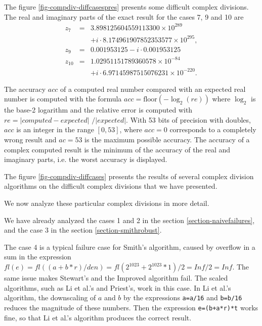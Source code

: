 \documentclass{paper}
\newcommand{\scivar}[1]{\texttt{#1}}
\begin{document}
The figure \ref{fig-compdiv-diffcasespres} presents some difficult complex divisions. 
The real and imaginary parts of the exact result for the cases 7, 9 and 10 are
\begin{eqnarray}
z_7 &=& 3.898125604559113300 \times 10^{289}          \nonumber \\
     && + i \cdot 8.174961907852353577 \times 10^{295},   \nonumber \\
z_9 &=&0.001953125 - i \cdot 0.001953125                      \nonumber \\
z_{10} &=& 1.02951151789360578\times 10^{-84}         \nonumber \\
        && + i \cdot 6.97145987515076231\times 10^{-220}. \nonumber 
\end{eqnarray}

The accuracy $acc$ of a computed real number compared 
with an expected real number is computed with the formula 
$acc = \textrm{floor}(-\log_2 ( re ))$
where $\log_2$ is the base-2 logarithm and 
the relative error is computed with $re = |computed-expected|$ 
$/|expected|$.
With 53 bits of precision with doubles, $acc$ is an integer  
in the range $[0,53]$, where $acc=0$ corresponds to a 
completely wrong result and $ac=53$ is the maximum 
possible accuracy. 
The accuracy of a complex computed result is the minimum of the 
accuracy of the real and imaginary parts, i.e. the worst 
accuracy is displayed. 

The figure \ref{fig-compdiv-diffcases} presents the results of several complex division algorithms 
on the difficult complex divisions that we have presented.

We now analyze these particular complex divisions in more detail.

We have already analyzed the cases 1 and 2 in the section \ref{section-naivefailures}, 
and the case 3 in the section \ref{section-smithrobust}.

The case 4 is a typical failure case for Smith's algorithm,
caused by overflow in a sum in the expression $fl(e) = fl((a + b * r) / den) 
= fl(2^{1023} + 2^{1023}*1)/2 = Inf/2=Inf$. 
The same issue makes Stewart's and the Improved algorithm fail. 
The scaled algorithms, such as Li et al.'s and Priest's, work in this case. 
In Li et al.'s algorithm, the downscaling of $a$ and $b$ by the 
expressions \scivar{a=a/16} and \scivar{b=b/16} reduces the magnitude 
of these numbers. 
Then the expression \scivar{e=(b+a*r)*t} works fine, so that Li et al.'s 
algorithm produces the correct result.
\end{document}
